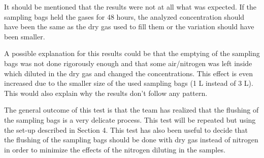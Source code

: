 It should be mentioned that the results were not at all what was expected. If the sampling bags held the gases for 48 hours, the analyzed concentration should have been the same as the dry gas used to fill them or the variation should have been smaller. 

A possible explanation for this results could be that the emptying of the sampling bags was not done rigorously enough and that some air/nitrogen was left inside which diluted in the dry gas and changed the concentrations. This effect is even increased due to the smaller size of the used sampling bags (1 L instead of 3 L). This would also explain why the results don't follow any pattern. 

The general outcome of this test is that the team has realized that the flushing of the sampling bags is a very delicate process. This test will be repeated but using the set-up described in Section 4. This test has also been useful to decide that the flushing of the sampling bags should be done with dry gas instead of nitrogen in order to minimize the effects of the nitrogen diluting in the samples. 

